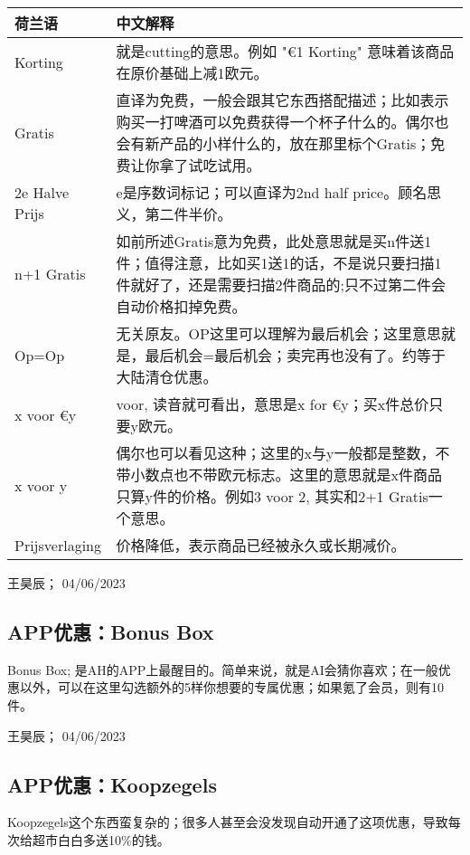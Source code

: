 \begin{flushleft}
\begin{tabular}{p{}|p{}}
\textbf{荷兰语} & \textbf{中文解释} \\ \hline
Korting & 就是cutting的意思。例如 "€1 Korting" 意味着该商品在原价基础上减1欧元。 \\ \hline
Gratis & 直译为免费，一般会跟其它东西搭配描述；比如表示购买一打啤酒可以免费获得一个杯子什么的。偶尔也会有新产品的小样什么的，放在那里标个Gratis；免费让你拿了试吃试用。 \\ \hline
2e Halve Prijs & e是序数词标记；可以直译为2nd half price。顾名思义，第二件半价。 \\ \hline
n+1 Gratis & 如前所述Gratis意为免费，此处意思就是买n件送1件；值得注意，比如买1送1的话，不是说只要扫描1件就好了，还是需要扫描2件商品的;只不过第二件会自动价格扣掉免费。 \\ \hline
Op=Op & 无关原友。OP这里可以理解为最后机会；这里意思就是，最后机会=最后机会；卖完再也没有了。约等于大陆清仓优惠。 \\ \hline
x voor €y & voor, 读音就可看出，意思是x for €y；买x件总价只要y欧元。 \\ \hline
x voor y & 偶尔也可以看见这种；这里的x与y一般都是整数，不带小数点也不带欧元标志。这里的意思就是x件商品只算y件的价格。例如3 voor 2, 其实和2+1 Gratis一个意思。 \\ \hline
Prijsverlaging & 价格降低，表示商品已经被永久或长期减价。 
\end{tabular}
\end{flushleft}
\begin{flushright}
王昊辰； 04/06/2023
\end{flushright}

\subsection{APP优惠：Bonus Box}
Bonus Box; 是AH的APP上最醒目的。简单来说，就是AI会猜你喜欢；在一般优惠以外，可以在这里勾选额外的5样你想要的专属优惠；如果氪了会员，则有10件。
\begin{flushright}
王昊辰； 04/06/2023
\end{flushright}

\subsection{APP优惠：Koopzegels}
Koopzegels这个东西蛮复杂的；很多人甚至会没发现自动开通了这项优惠，导致每次给超市白白多送10\%的钱。

